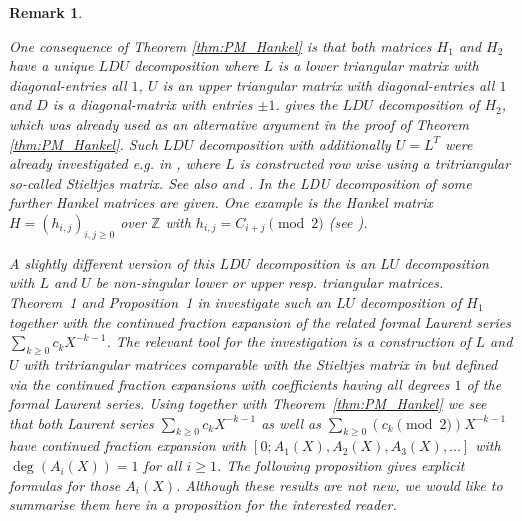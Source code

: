 \documentclass{article}
\newcommand{\NN}{\mathbb N}
\newcommand{\ZZ}{\mathbb Z}
\newcommand{\diag}{\mathrm{ diag}}
\newtheorem{proposition}{Proposition}
\newtheorem{remark}{Remark}
\begin{document}





\begin{remark}\label{rem:3}{\rm 
One consequence of Theorem \ref{thm:PM_Hankel} is that both matrices $H_1$ and $H_2$ have a unique $LDU$ decomposition where $L$ is a lower triangular matrix with diagonal-entries all $1$, $U$ is an upper triangular matrix with diagonal-entries all $1$ and $D$ is a diagonal-matrix with entries $\pm 1$. \cite[Theorem~10.1 (i)]{bacher} gives the $LDU$ decomposition of $H_2$, which was already used as an alternative argument in the proof of Theorem \ref{thm:PM_Hankel}. 
Such $LDU$ decomposition with additionally $U=L^T$ were already investigated e.g. in \cite{PeartWoan}, where $L$ is constructed row wise using a tritriangular so-called Stieltjes matrix. See also \cite{bacher} and \cite{Poo}. In \cite{bacher} the LDU decomposition of some further Hankel matrices are given. One example is the Hankel matrix $H=(h_{i,j})_{i,j\geq 0}$ over $\ZZ$ with $h_{i,j}=C_{i+j}\pmod{2}$ (see \cite[Theorem~10.1]{bacher}). 

A slightly different version of this $LDU$ decomposition is an $LU$ decomposition with $L$ and $U$ be non-singular lower or upper resp. triangular matrices. Theorem~1 and Proposition~1 in \cite{hofJNT} investigate such an $LU$ decomposition of $H_1$ together with the continued fraction expansion of the related formal Laurent series $\sum_{k\geq 0}c_kX^{-k-1}$. The relevant tool for the investigation is a construction of $L$ and $U$ with tritriangular matrices comparable with the Stieltjes matrix in \cite{PeartWoan} but defined via the continued fraction expansions with coefficients having all degrees $1$ of the formal Laurent series. Using \cite[Lemma~1]{hofJNT} together with Theorem~\ref{thm:PM_Hankel} we see that both Laurent series $\sum_{k\geq 0}c_kX^{-k-1}$ as well as $\sum_{k\geq 0}(c_k\pmod 2)X^{-k-1}$ have continued fraction expansion with $[0;A_1(X),A_2(X),A_3(X),\ldots]$ with $\deg(A_i(X))=1$ for all $i\geq 1$. The following proposition gives explicit formulas for those $A_i(X)$. Although these results are not new, we would like to summarise them here in a proposition for the interested reader.}
\end{remark}
\end{document}
